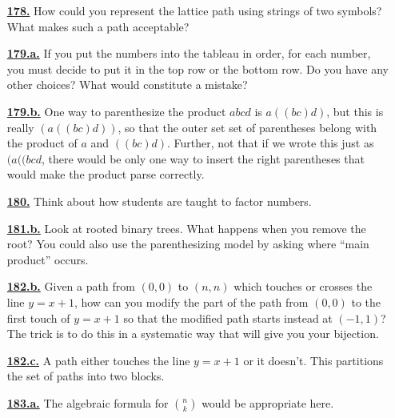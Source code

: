 \documentclass[10pt,]{book}
\theoremstyle{plain}
\theoremstyle{definition}
\theoremstyle{definition}
\theoremstyle{definition}
\numberwithin{equation}{chapter}
\begin{document}
\begin{itemize}[itemsep=1em]
\hypertarget{a-178}{}\item[\textbf{\hyperref[act-pathshdseq]{178.}}]
\hypertarget{p-1009}{}%
How could you represent the lattice path using strings of two symbols?  What makes such a path acceptable?%

\hypertarget{a-179.a}{}\item[\textbf{\hyperref[task-187]{179.a.}}]
\hypertarget{p-1013}{}%
If you put the numbers into the tableau in order, for each number, you must decide to put it in the top row or the bottom row.  Do you have any other choices?  What would constitute a mistake?%

\hypertarget{a-179.b}{}\item[\textbf{\hyperref[task-188]{179.b.}}]
\hypertarget{p-1015}{}%
One way to parenthesize the product \(abcd\) is \(a((bc)d)\), but this is really \((a((bc)d))\), so that the outer set set of parentheses belong with the product of \(a\) and \(((bc)d)\).  Further, not that if we wrote this just as \((a((bcd\), there would be only one way to insert the right parentheses that would make the product parse correctly.%

\hypertarget{a-180}{}\item[\textbf{\hyperref[activity-173]{180.}}]
\hypertarget{p-1018}{}%
Think about how students are taught to factor numbers.%

\hypertarget{a-181.b}{}\item[\textbf{\hyperref[task-190]{181.b.}}]
\hypertarget{p-1023}{}%
Look at rooted binary trees.  What happens when you remove the root?  You could also use the parenthesizing model by asking where ``main product'' occurs.%

\hypertarget{a-182.b}{}\item[\textbf{\hyperref[task-193]{182.b.}}]
\hypertarget{p-1030}{}%
Given a path from \((0, 0)\) to \((n, n)\) which touches or crosses the line \(y = x + 1\), how can you modify the part of the path from \((0, 0)\) to the first touch of \(y = x + 1\) so that the modified path starts instead at \((-1, 1)\)? The trick is to do this in a systematic way that will give you your bijection.%

\hypertarget{a-182.c}{}\item[\textbf{\hyperref[task-194]{182.c.}}]
\hypertarget{p-1033}{}%
A path either touches the line \(y = x + 1\) or it doesn't. This partitions the set of paths into two blocks.%

\hypertarget{a-183.a}{}\item[\textbf{\hyperref[task-195]{183.a.}}]
\hypertarget{p-1037}{}%
The algebraic formula for \(\binom{n}{k}\) would be appropriate here.%


\end{itemize}
\end{document}
